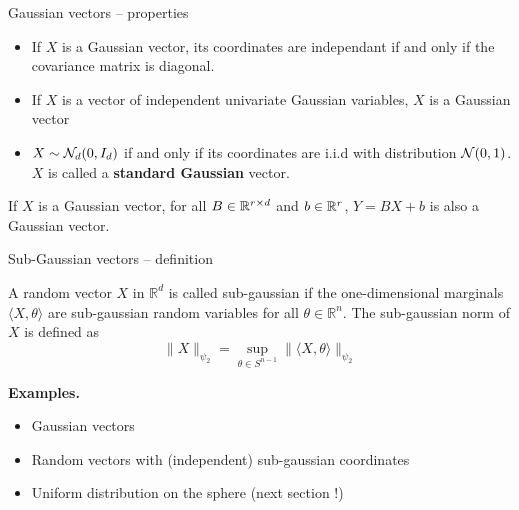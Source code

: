 \documentclass{beamer}
\begin{document}
  \begin{frame}{Gaussian vectors -- properties}

    \begin{corollary}
      \begin{itemize}
      \item If $X$ is a Gaussian vector, its coordinates are independant if and only if
        the covariance matrix is diagonal.

        \pause

      \item If $X$ is a vector of independent univariate
        Gaussian variables, $X$ is a Gaussian vector

        \pause

      \item  $X \sim \mathcal{N}_d(0,I_d)$ if and only if its coordinates are i.i.d with
        distribution $\mathcal{N}(0,1)$. $X$ is called a \textbf{standard Gaussian}
        vector.

      \end{itemize}
    \end{corollary}

    \pause

    \begin{proposition}
      If $X$ is a Gaussian vector, for all $B \in \mathbb{R}^{r \times d}$ and $b
      \in \mathbb{R}^r$, $Y = BX + b$ is also a Gaussian vector.
    \end{proposition}

  \end{frame}

  \begin{frame}{Sub-Gaussian vectors -- definition}
    \begin{definition} A random vector $X$ in
      $\mathbb{R}^{d}$ is called sub-gaussian if the one-dimensional marginals
      $\langle X, \theta \rangle$ are sub-gaussian random variables for all $\theta \in \mathbb{R}^{n} .$ The sub-gaussian norm of $X$ is defined as
      $$
      \|X\|_{\psi_{2}}=\sup _{\theta \in S^{n-1}}\|\langle X, \theta\rangle\|_{\psi_{2}}
      $$

    \end{definition}

    \textbf{Examples.}
    
    \begin{itemize}
    \item Gaussian vectors
    \item Random vectors with (independent) sub-gaussian coordinates
    \item Uniform distribution on the sphere (next section !)
    \end{itemize}
  \end{frame}
\end{document}
